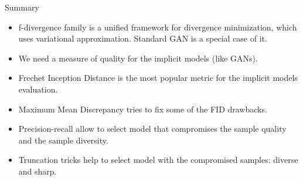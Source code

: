 \begin{frame}{Summary}
	\begin{itemize}
		\item f-divergence family is a unified framework for divergence minimization, which uses variational approximation. Standard GAN is a special case of it.
		\vfill
		\item We need a measure of quality for the implicit models (like GANs). 
		\vfill 
		\item Frechet Inception Distance is the most popular metric for the implicit models evaluation. 
		\vfill
		\item Maximum Mean Discrepancy tries to fix some of the FID drawbacks.
		\vfill
		\item Precision-recall allow to select model that compromises the sample quality and the sample diversity.	
		\vfill 
		\item Truncation tricks help to select model with the compromised samples: diverse and sharp.
	\end{itemize}
\end{frame}
 
